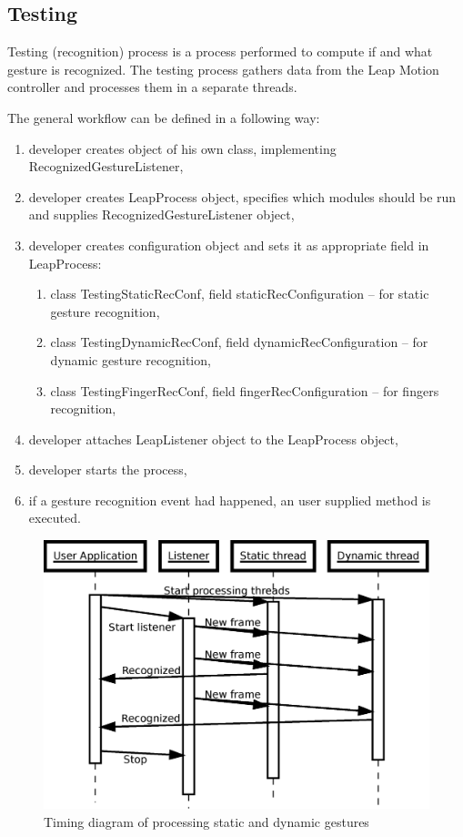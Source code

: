 \subsection{Testing}

Testing (recognition) process is a process performed to compute if and what gesture is recognized. 
The testing process gathers data from the Leap Motion controller and processes them in a separate threads.

The general workflow can be defined in a following way:
\begin{enumerate}
  \item developer creates object of his own class, implementing RecognizedGestureListener,
  \item developer creates LeapProcess object, specifies which modules should be run and supplies RecognizedGestureListener object,
  \item developer creates configuration object and sets it as appropriate field in LeapProcess:
  \begin{enumerate}
  	\item class TestingStaticRecConf, field staticRecConfiguration -- for static gesture recognition,
  	\item class TestingDynamicRecConf, field dynamicRecConfiguration -- for dynamic gesture recognition,
  	\item class TestingFingerRecConf, field fingerRecConfiguration -- for fingers recognition,
  \end{enumerate}
  \item developer attaches LeapListener object to the LeapProcess object,
  \item developer starts the process,
  \item if a gesture recognition event had happened, an user supplied method is executed.
\end{enumerate}

\begin{figure}[htb]
\centering
 \includegraphics[width=0.8\columnwidth]{figures/timeline.eps}
 \caption[]{Timing diagram of processing static and dynamic gestures}
 \label{processingtimeline}
\end{figure}

